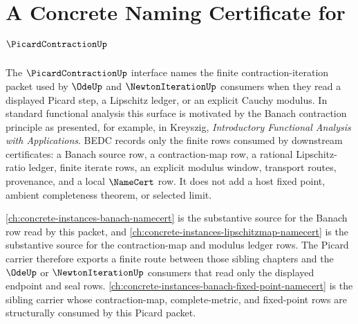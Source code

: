 \chapter{A Concrete Naming Certificate for $\PicardContractionUp$}
\label{ch:concrete-instances-picardcontraction-namecert}

The $\PicardContractionUp$ interface names the finite contraction-iteration
packet used by $\OdeUp$ and $\NewtonIterationUp$ consumers when they read a
displayed Picard step, a Lipschitz ledger, or an explicit Cauchy modulus. In
standard functional analysis this surface is motivated by the Banach
contraction principle as presented, for example, in Kreyszig,
\emph{Introductory Functional Analysis with Applications}. BEDC records only
the finite rows consumed by downstream certificates: a Banach source row, a
contraction-map row, a rational Lipschitz-ratio ledger, finite iterate rows,
an explicit modulus window, transport routes, provenance, and a local
$\NameCert$ row. It does not add a host fixed point, ambient completeness
theorem, or selected limit.

\autoref{ch:concrete-instances-banach-namecert} is the substantive source for
the Banach row read by this packet, and
\autoref{ch:concrete-instances-lipschitzmap-namecert} is the substantive
source for the contraction-map and modulus ledger rows. The Picard carrier
therefore exports a finite route between those sibling chapters and the
$\OdeUp$ or $\NewtonIterationUp$ consumers that read only the displayed
endpoint and seal rows.
\autoref{ch:concrete-instances-banach-fixed-point-namecert} is the sibling
carrier whose contraction-map, complete-metric, and fixed-point rows are
structurally consumed by this Picard packet.

